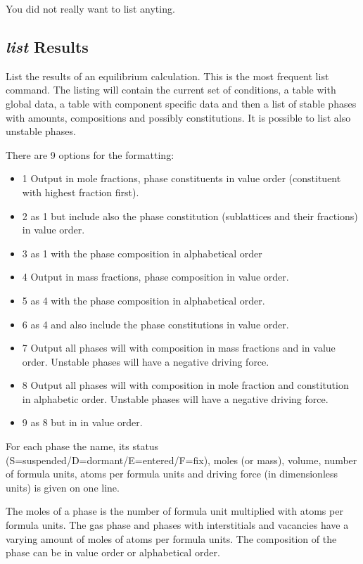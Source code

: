 \documentclass[11pt]{article}
\begin{document}
You did not really want to list anyting.

\hypertarget{List results}{}
\hypertarget{LIST RESULTS}{}
\subsection{{\em list} Results}

List the results of an equilibrium calculation.  This is the most
frequent list command.  The listing will contain the current set of
conditions, a table with global data, a table with component specific
data and then a list of stable phases with amounts, compositions and
possibly constitutions.  It is possible to list also unstable phases.

There are 9 options for the formatting:
\begin{itemize}
\item 1 Output in mole fractions, phase constituents in value order
  (constituent with highest fraction first).
\item 2 as 1 but include also the phase constitution (sublattices and
  their fractions) in value order.
\item 3 as 1 with the phase composition in alphabetical order
\item 4 Output in mass fractions, phase composition in value order.
\item 5 as 4 with the phase composition in alphabetical order.
\item 6 as 4 and also include the phase constitutions in value order.
\item 7 Output all phases will with composition in mass fractions and
  in value order.  Unstable phases will have a negative driving force.
\item 8 Output all phases will with composition in mole fraction and
  constitution in alphabetic order.  Unstable phases will have a
  negative driving force.
\item 9 as 8 but in in value order.
\end{itemize}

For each phase the name, its status
(S=suspended/D=dormant/E=entered/F=fix), moles (or mass), volume,
number of formula units, atoms per formula units and driving force (in
dimensionless units) is given on one line.

The moles of a phase is the number of formula unit multiplied with
atoms per formula units.  The gas phase and phases with interstitials
and vacancies have a varying amount of moles of atoms per formula
units.  The composition of the phase can be in value order or
alphabetical order.
\end{document}
